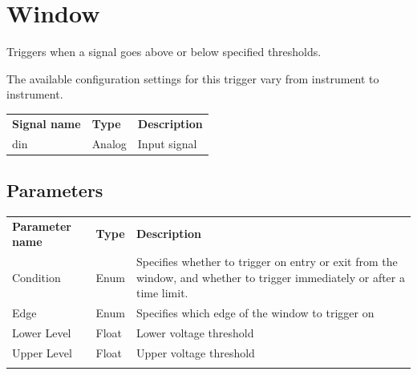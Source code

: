 \section{Window}

Triggers when a signal goes above or below specified thresholds.

The available configuration settings for this trigger vary from instrument to instrument.

\begin{tabularx}{16cm}{llX}
\thickhline
\textbf{Signal name} & \textbf{Type} & \textbf{Description} \\
\thickhline
din & Analog & Input signal \\
\end{tabularx}

\subsection{Parameters}

\begin{tabularx}{16cm}{llX}
\thickhline
\textbf{Parameter name} & \textbf{Type} & \textbf{Description} \\
\thickhline
Condition & Enum & Specifies whether to trigger on entry or exit from the window, and whether to trigger immediately or
after a time limit.\\
\thickhline
Edge & Enum & Specifies which edge of the window to trigger on\\
\thickhline
Lower Level & Float & Lower voltage threshold\\
\thickhline
Upper Level & Float & Upper voltage threshold\\
\thickhline
\end{tabularx}

